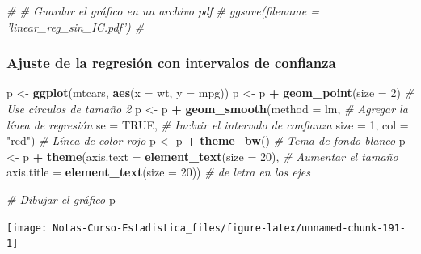 \documentclass[
  12pt,
]{book}
\newenvironment{Shaded}{\begin{snugshade}}{\end{snugshade}}
\newcommand{\CommentTok}[1]{\textcolor[rgb]{0.56,0.35,0.01}{\textit{#1}}}
\newcommand{\DataTypeTok}[1]{\textcolor[rgb]{0.13,0.29,0.53}{#1}}
\newcommand{\DecValTok}[1]{\textcolor[rgb]{0.00,0.00,0.81}{#1}}
\newcommand{\KeywordTok}[1]{\textcolor[rgb]{0.13,0.29,0.53}{\textbf{#1}}}
\newcommand{\NormalTok}[1]{#1}
\newcommand{\OperatorTok}[1]{\textcolor[rgb]{0.81,0.36,0.00}{\textbf{#1}}}
\newcommand{\OtherTok}[1]{\textcolor[rgb]{0.56,0.35,0.01}{#1}}
\newcommand{\StringTok}[1]{\textcolor[rgb]{0.31,0.60,0.02}{#1}}
\theoremstyle{definition}
\theoremstyle{definition}
\theoremstyle{definition}
\theoremstyle{remark}
\begin{document}
\begin{Shaded}
\begin{Highlighting}[]
\CommentTok{# # Guardar el gráfico en un archivo pdf}
\CommentTok{# ggsave(filename = 'linear_reg_sin_IC.pdf') # }
\end{Highlighting}
\end{Shaded}

\hypertarget{ajuste-de-la-regresiuxf3n-con-intervalos-de-confianza}{%
\subsubsection{Ajuste de la regresión con intervalos de confianza}\label{ajuste-de-la-regresiuxf3n-con-intervalos-de-confianza}}

\begin{Shaded}
\begin{Highlighting}[]
\NormalTok{p <-}\StringTok{ }\KeywordTok{ggplot}\NormalTok{(mtcars, }\KeywordTok{aes}\NormalTok{(}\DataTypeTok{x =}\NormalTok{ wt, }\DataTypeTok{y =}\NormalTok{ mpg)) }
\NormalTok{p <-}\StringTok{ }\NormalTok{p }\OperatorTok{+}\StringTok{ }\KeywordTok{geom_point}\NormalTok{(}\DataTypeTok{size =} \DecValTok{2}\NormalTok{)       }\CommentTok{# Use circulos de tamaño 2}
\NormalTok{p <-}\StringTok{ }\NormalTok{p }\OperatorTok{+}\StringTok{ }\KeywordTok{geom_smooth}\NormalTok{(}\DataTypeTok{method =}\NormalTok{ lm,   }\CommentTok{# Agregar la línea de regresión }
              \DataTypeTok{se =} \OtherTok{TRUE}\NormalTok{,            }\CommentTok{# Incluir el intervalo de confianza   }
              \DataTypeTok{size =} \DecValTok{1}\NormalTok{,}
              \DataTypeTok{col =} \StringTok{"red"}\NormalTok{)          }\CommentTok{# Línea de color rojo }
\NormalTok{p <-}\StringTok{ }\NormalTok{p }\OperatorTok{+}\StringTok{ }\KeywordTok{theme_bw}\NormalTok{()                 }\CommentTok{# Tema de fondo blanco}
\NormalTok{p <-}\StringTok{ }\NormalTok{p }\OperatorTok{+}\StringTok{ }\KeywordTok{theme}\NormalTok{(}\DataTypeTok{axis.text =} \KeywordTok{element_text}\NormalTok{(}\DataTypeTok{size =} \DecValTok{20}\NormalTok{),  }\CommentTok{# Aumentar el tamaño }
               \DataTypeTok{axis.title =} \KeywordTok{element_text}\NormalTok{(}\DataTypeTok{size =} \DecValTok{20}\NormalTok{)) }\CommentTok{# de letra en los ejes}

\CommentTok{# Dibujar el gráfico}
\NormalTok{p   }
\end{Highlighting}
\end{Shaded}

\begin{center}\texttt{[image: Notas-Curso-Estadistica\_files/figure-latex/unnamed-chunk-191-1]} \end{center}
\end{document}

